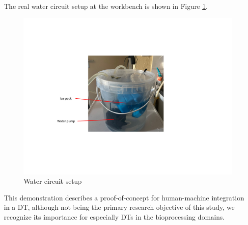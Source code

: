 The real water circuit setup at the workbench is shown in Figure \ref{fig:workbench_bucket}.

\begin{figure}[hbt!]
  \centering
  \includegraphics[scale=0.65]{figures/workbench_bucket.pdf}
  \caption{Water circuit setup}
  \label{fig:workbench_bucket}
\end{figure}

This demonstration describes a proof-of-concept for human-machine integration in a DT, although not being the primary research objective of this study, we recognize its importance for especially DTs in the bioprocessing domains.

